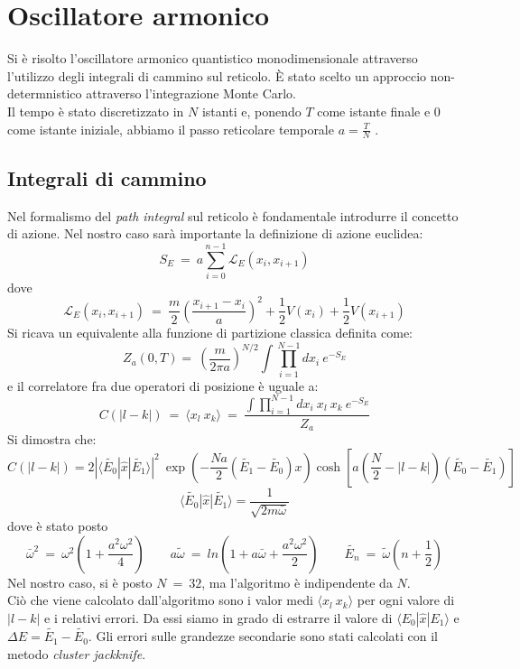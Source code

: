 \chapter{Oscillatore armonico}
Si è risolto l'oscillatore armonico quantistico monodimensionale attraverso l'utilizzo degli integrali di cammino sul reticolo.
È stato scelto un approccio non-determnistico attraverso l'integrazione Monte Carlo.\\
Il tempo è stato discretizzato in $N$ istanti e, ponendo $T$ come istante finale e $0$ come istante iniziale,
abbiamo il passo reticolare temporale $ a = \frac{T}{N}$ .
\section{Integrali di cammino}
Nel formalismo del \emph{path integral} sul reticolo è fondamentale introdurre il concetto di azione.
Nel nostro caso sarà importante la definizione di azione euclidea:
$$
 S_E  \ = \ a \sum_{i=0}^{n-1} \mathcal{L}_E(x_i,x_{i+1})
$$
dove
$$
\mathcal{L}_E(x_i,x_{i+1}) \ = \ \frac{m}{2} \left( \frac{x_{i+1} -x_{i}}{a} \right)^2 + \frac{1}{2}V(x_i)  +\frac{1}{2}V(x_{i+1})
$$
 Si ricava un equivalente alla funzione di partizione classica definita come: 
$$
 Z_a (0,T) =  \ \left( \frac{m}{2 \pi a}\right)^{N/2} \int \prod_{i=1}^{N-1} dx_i \ e^{-S_E}
$$
e il correlatore fra due operatori di posizione è uguale a:
$$
 C( | l -k|) \ = \ \langle x_l \ x_k \rangle  \ = \  \frac{ \int \prod_{i=1}^{N-1} dx_i \ x_l \ x_k \ e^{-S_E}}{Z_a}
$$
Si dimostra che:
$$
 C( | l -k|)= 2 | \langle \tilde{E_0} | \hat{x} | \tilde{E_1} \rangle  |^2 \ \exp{\left( - \frac{N a}{2} \left( \tilde{E_1}-\tilde{E_0} \right) x \right)} \cosh \left[ a \left( \frac{N}{2} - | l - k | \right) (\tilde{E_0} -\tilde{E_1}) \right]  
$$
$$ 
\langle \tilde{E_0} | \hat{x} | \tilde{E_1} \rangle  = \frac{1}{\sqrt{2  m \bar{\omega}}}
$$
dove è stato posto
$$
 \bar{\omega}^2  \ = \  \omega^2 \left(1 + \frac{a^2 \omega^2}{4} \right) \qquad a \tilde{\omega} \ = \ ln \left( 1 + a \bar{\omega} + \frac{a^2 \omega^2}{2} \right) \qquad \tilde{E_n} \ = \  \tilde{\omega}\left( n + \frac{1}{2} \right) 
$$
Nel nostro caso, si è posto $ N \ = \ 32 $, ma l'algoritmo è indipendente da $N$.\\
Ciò che viene calcolato dall'algoritmo sono i valor medi $\langle x_l \ x_k \rangle $ per ogni valore di $ | l - k| $ e i relativi errori.
Da essi siamo in grado di estrarre il valore di $ \langle E_0 | \hat{x} | E_1 \rangle $ e $\Delta E = \tilde{E_1}-\tilde{E_0} $.
Gli errori sulle grandezze secondarie sono stati calcolati con il metodo \emph{cluster jackknife}.
